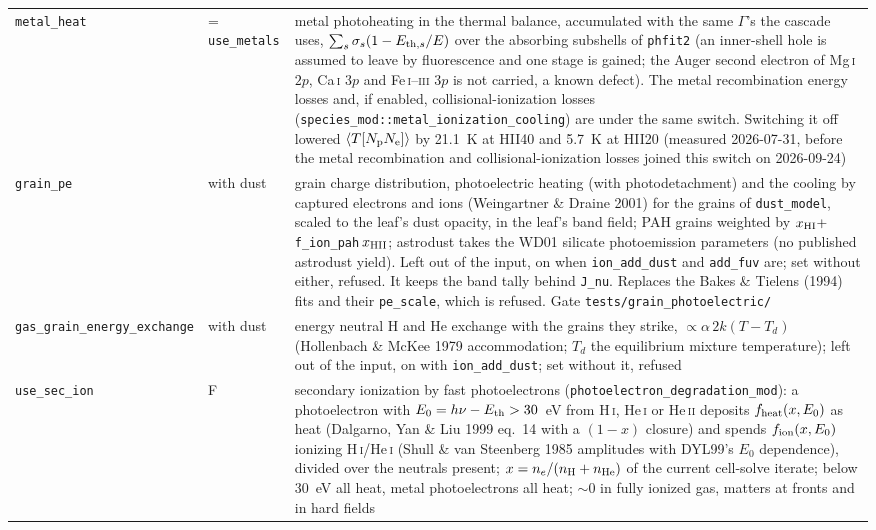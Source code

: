 \documentclass[english,a4paper]{my_memo}
\newcommand{\code}[1]{\texttt{#1}}
\begin{document}
{\begin{longtable}{llp{7.2cm}}
\code{metal\_heat} & = \code{use\_metals} & metal photoheating in the thermal balance, accumulated with the same $\Gamma$'s the cascade uses, $\sum_s \sigma_s(1 - E_{{\rm th},s}/E)$ over the absorbing subshells of \code{phfit2} (an inner-shell hole is assumed to leave by fluorescence and one stage is gained; the Auger second electron of Mg\,\textsc{i} $2p$, Ca\,\textsc{i} $3p$ and Fe\,\textsc{i}--\textsc{iii} $3p$ is not carried, a known defect).  The metal recombination energy losses and, if enabled, collisional-ionization losses (\code{species\_mod::metal\_ionization\_cooling}) are under the same switch.  Switching it off lowered $\langle T[N_{\rm p}N_{\rm e}]\rangle$ by 21.1~K at HII40 and 5.7~K at HII20 (measured 2026-07-31, before the metal recombination and collisional-ionization losses joined this switch on 2026-09-24) \\
\code{grain\_pe} & with dust & grain charge distribution, photoelectric heating (with photodetachment) and the cooling by captured electrons and ions (Weingartner \& Draine 2001) for the grains of \code{dust\_model}, scaled to the leaf's dust opacity, in the leaf's band field; PAH grains weighted by $x_{\rm HI} + $ \code{f\_ion\_pah}$\,x_{\rm HII}$; astrodust takes the WD01 silicate photoemission parameters (no published astrodust yield).  Left out of the input, on when \code{ion\_add\_dust} and \code{add\_fuv} are; set without either, refused.  It keeps the band tally behind \code{J\_nu}.  Replaces the Bakes \& Tielens (1994) fits and their \code{pe\_scale}, which is refused.  Gate \code{tests/grain\_photoelectric/} \\
\code{gas\_grain\_energy\_exchange} & with dust & energy neutral H and He exchange with the grains they strike, $\propto \alpha\,2k(T - T_d)$ (Hollenbach \& McKee 1979 accommodation; $T_d$ the equilibrium mixture temperature); left out of the input, on with \code{ion\_add\_dust}; set without it, refused \\
\code{use\_sec\_ion} & F & secondary ionization by fast photoelectrons (\code{photoelectron\_degradation\_mod}): a photoelectron with $E_0 = h\nu - E_{\rm th} > 30$~eV from H\,\textsc{i}, He\,\textsc{i} or He\,\textsc{ii} deposits $f_{\rm heat}(x,E_0)$ as heat (Dalgarno, Yan \& Liu 1999 eq.~14 with a $(1-x)$ closure) and spends $f_{\rm ion}(x,E_0)$ ionizing H\,\textsc{i}/He\,\textsc{i} (Shull \& van Steenberg 1985 amplitudes with DYL99's $E_0$ dependence), divided over the neutrals present; $x = n_e/(n_{\rm H}+n_{\rm He})$ of the current cell-solve iterate; below 30~eV all heat, metal photoelectrons all heat; $\sim$0 in fully ionized gas, matters at fronts and in hard fields\\

\end{longtable}}
\end{document}
